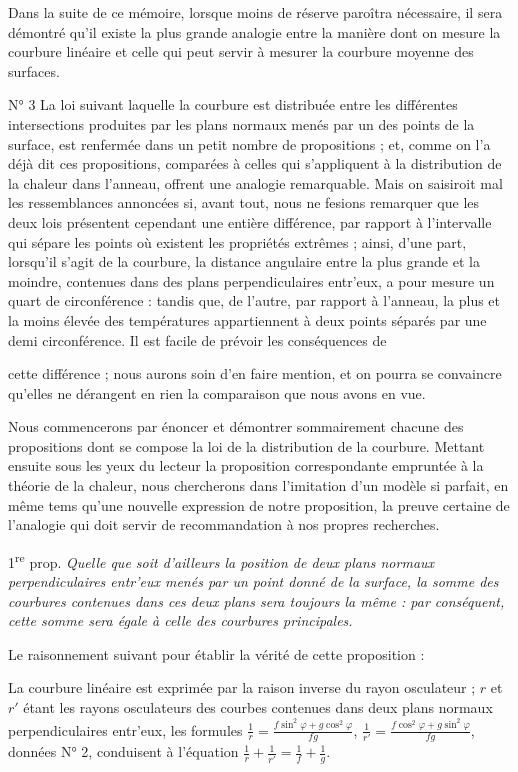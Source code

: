 \documentclass[11pt,a4paper]{article}
\begin{document}
Dans la suite de ce mémoire, lorsque moins de réserve paroîtra nécessaire, il
sera démontré qu'il existe la plus grande analogie entre la manière dont on
mesure la courbure linéaire et celle qui peut servir à mesurer la courbure
moyenne des surfaces.

N° 3 La loi suivant laquelle la courbure est distribuée entre les différentes
intersections produites par les plans normaux menés par un des points de la
surface, est renfermée dans un petit nombre de propositions ; et, comme on
l'a déjà dit ces propositions, comparées à celles qui s'appliquent à la
distribution de la chaleur dans l'anneau, offrent une analogie remarquable.
Mais on saisiroit mal les ressemblances annoncées si, avant tout, nous ne
fesions remarquer que les deux lois présentent cependant une entière
différence, par rapport à l'intervalle qui sépare les points où existent les
propriétés extrêmes ; ainsi, d'une part, lorsqu'il s'agit de la courbure, la
distance angulaire entre la plus grande et la moindre, contenues dans des
plans perpendiculaires entr'eux, a pour mesure un quart de circonférence :
tandis que, de l'autre, par rapport à l'anneau, la plus et la moins élevée
des températures appartiennent à deux points séparés par une demi
circonférence. Il est facile de prévoir les conséquences de

cette différence ; nous aurons soin d'en faire mention, et on pourra se
convaincre qu'elles ne dérangent en rien la comparaison que nous avons en
vue.

Nous commencerons par énoncer et démontrer sommairement chacune des
propositions dont se compose la loi de la distribution de la courbure.
Mettant ensuite sous les yeux du lecteur la proposition correspondante
empruntée à la théorie de la chaleur, nous chercherons dans l'imitation d'un
modèle si parfait, en même tems qu'une nouvelle expression de notre
proposition, la preuve certaine de l'analogie qui doit servir de
recommandation à nos propres recherches.

1\textsuperscript{re} prop. \emph{Quelle que soit d'ailleurs la position de
deux plans normaux perpendiculaires entr'eux menés par un point donné de la
surface, la somme des courbures contenues dans ces deux plans sera toujours
la même : par conséquent, cette somme sera égale à celle des courbures
principales.}

Le raisonnement suivant  pour établir la vérité de cette
proposition :

La courbure linéaire est exprimée par la raison inverse du rayon osculateur ;
$r$ et $r'$ étant les rayons osculateurs des courbes contenues dans deux
plans normaux perpendiculaires entr'eux, les formules
$\frac{1}{r} = \frac{f\sin^{2}\varphi + g\cos^{2}\varphi}{fg}$,
$\frac{1}{r'} = \frac{f\cos^{2}\varphi + g\sin^{2}\varphi}{fg}$, données
N° 2, conduisent à l'équation
$\frac{1}{r} + \frac{1}{r'} = \frac{1}{f} + \frac{1}{g}$.
\end{document}
